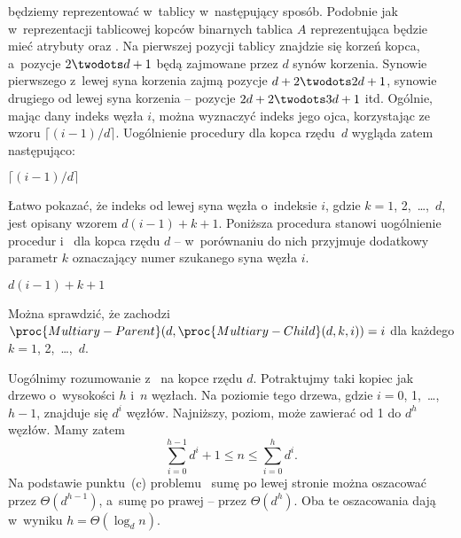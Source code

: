
\subproblem %
 będziemy reprezentować w~tablicy w~następujący sposób.
Podobnie jak w~reprezentacji tablicowej kopców binarnych tablica $A$ reprezentująca  będzie mieć atrybuty  oraz .
Na pierwszej pozycji tablicy znajdzie się korzeń kopca, a~pozycje $2\twodots d+1$ będą zajmowane przez $d$ synów korzenia.
Synowie pierwszego z~lewej syna korzenia zajmą pozycje $d+2\twodots2d+1$, synowie drugiego od lewej syna korzenia -- pozycje $2d+2\twodots3d+1$ itd.
Ogólnie, mając dany indeks węzła $i$, można wyznaczyć indeks jego ojca, korzystając ze wzoru $\lceil(i-1)/d\rceil$.
Uogólnienie procedury  dla kopca rzędu~$d$ wygląda zatem następująco:
\begin{codebox}
\zi	\Return $\lceil(i-1)/d\rceil$
\end{codebox}

Łatwo pokazać, że indeks  od lewej syna węzła o~indeksie $i$, gdzie $k=1$, 2,~\dots,~$d$, jest opisany wzorem $d(i-1)+k+1$.
Poniższa procedura stanowi uogólnienie procedur  i~ dla kopca rzędu $d$ -- w~porównaniu do nich przyjmuje dodatkowy parametr $k$ oznaczający numer szukanego syna węzła $i$.
\begin{codebox}
\zi	\Return $d(i-1)+k+1$
\end{codebox}

Można sprawdzić, że zachodzi $\proc{Multiary-Parent}(d,\proc{Multiary-Child}(d,k,i))=i$ dla każdego $k=1$, 2,~\dots,~$d$.

\subproblem %
Uogólnimy rozumowanie z~ na kopce rzędu $d$.
Potraktujmy taki kopiec jak drzewo  o~wysokości $h$ i~$n$ węzłach.
Na  poziomie tego drzewa, gdzie $i=0$, 1,~\dots,~$h-1$, znajduje się $d^i$ węzłów.
Najniższy,  poziom, może zawierać od 1 do $d^h$ węzłów.
Mamy zatem
\[
    \sum_{i=0}^{h-1}d^i+1 \le n \le \sum_{i=0}^hd^i.
\]
Na podstawie punktu~(c) problemu~ sumę po lewej stronie można oszacować przez $\Theta(d^{h-1})$, a~sumę po prawej -- przez $\Theta(d^h)$.
Oba te oszacowania dają w~wyniku $h=\Theta(\log_dn)$.

